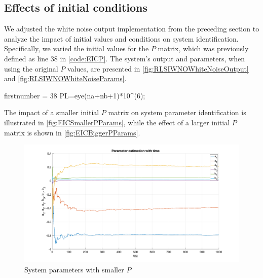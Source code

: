 \FloatBarrier
\subsection{Effects of initial conditions}
We adjusted the white noise output implementation from the preceding section to analyze the impact of initial values and conditions on system identification. Specifically, we varied the initial values for the $P$ matrix, which was previously defined as line 38 in \autoref{code:EICP}. The system's output and parameters, when using the original $P$ values, are presented in \autoref{fig:RLSIWNOWhiteNoiseOutput} and \autoref{fig:RLSIWNOWhiteNoiseParams}.

\begin{code}
	\begin{matlabcode}{firstnumber = 38}
        P{L}=eye(na+nb+1)*10^(6); %
	\end{matlabcode}
	\label{code:EICP}
\end{code}

The impact of a smaller initial $P$ matrix on system parameter identification is illustrated in \autoref{fig:EICSmallerPParams}, while the effect of a larger initial $P$ matrix is shown in \autoref{fig:EICBiggerPParams}.

\begin{figure}
	\centering
	\includegraphics[totalheight=8cm]{images/EICSmallerPParams.png}
	\caption{System parameters with smaller $P$}
	\label{fig:EICSmallerPParams}
\end{figure}

